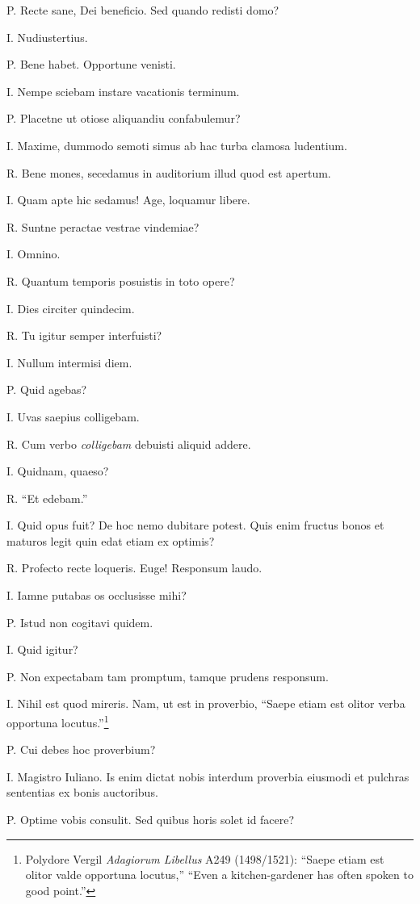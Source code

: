 \documentclass{article}
\begin{document}
P. Recte sane, Dei beneficio. Sed quando redisti domo?

I. Nudiustertius.

P. Bene habet. Opportune venisti.

I. Nempe sciebam instare vacationis terminum.

P. Placetne ut otiose aliquandiu confabulemur?

I. Maxime, dummodo semoti simus ab hac turba clamosa ludentium.

R. Bene mones, secedamus in auditorium illud quod est apertum.

I. Quam apte hic sedamus! Age, loquamur libere.

R. Suntne peractae vestrae vindemiae?

I. Omnino.

R. Quantum temporis posuistis in toto opere?

I. Dies circiter quindecim.

R. Tu igitur semper interfuisti?

I. Nullum intermisi diem.

P. Quid agebas?

I. Uvas saepius colligebam.

R. Cum verbo \emph{colligebam} debuisti aliquid addere.

I. Quidnam, quaeso?

R. ``Et edebam.''

I. Quid opus fuit? De hoc nemo dubitare potest. Quis enim fructus bonos et maturos legit quin edat etiam ex optimis?

R. Profecto recte loqueris. Euge! Responsum laudo.

I. Iamne putabas os occlusisse mihi?

P. Istud non cogitavi quidem.

I. Quid igitur?

P. Non expectabam tam promptum, tamque prudens responsum.

I. Nihil est quod mireris. Nam, ut est in proverbio, ``Saepe etiam est olitor verba opportuna locutus.''\footnote{Polydore Vergil \emph{Adagiorum Libellus} A249 (1498/1521): ``Saepe etiam est olitor valde opportuna locutus,'' ``Even a kitchen-gardener has often spoken to good point.''}

P. Cui debes hoc proverbium?

I. Magistro Iuliano. Is enim dictat nobis interdum proverbia eiusmodi et pulchras sententias ex bonis auctoribus.

P. Optime vobis consulit. Sed quibus horis solet id facere?
\end{document}
